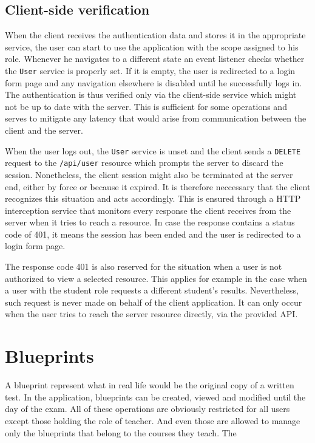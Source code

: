 \documentclass[thesis=M,english,hidelinks]{FITthesis}[2012/10/20]
\newcommand{\code}{\texttt}
\begin{document}
\subsection{Client-side verification}

When the client receives the authentication data and stores it in the appropriate service, the user can start to use the application with the scope assigned to his role. Whenever he navigates to a different state an event listener checks whether the \code{User} service is properly set. If it is empty, the user is redirected to a login form page and any navigation elsewhere is disabled until he successfully logs in. The authentication is thus verified only via the client-side service which might not be up to date with the server. This is sufficient for some operations and serves to mitigate any latency that would arise from communication between the client and the server.

When the user logs out, the \code{User} service is unset and the client sends a \code{DELETE} request to the \code{/api/user} resource which prompts the server to discard the session. Nonetheless, the client session might also be terminated at the server end, either by force or because it expired. It is therefore neccessary that the client recognizes this situation and acts accordingly. This is ensured through a HTTP interception service that monitors every response the client receives from the server when it tries to reach a resource. In case the response contains a status code of 401, it means the session has been ended and the user is redirected to a login form page.

The response code 401 is also reserved for the situation when a user is not authorized to view a selected resource. This applies for example in the case when a user with the student role requests a different student's results. Nevertheless, such request is never made on behalf of the client application. It can only occur when the user tries to reach the server resource directly, via the provided API.

\section{Blueprints}

A blueprint represent what in real life would be the original copy of a written test. In the application, blueprints can be created, viewed and modified until the day of the exam. All of these operations are obviously restricted for all users except those holding the role of teacher. And even those are allowed to manage only the blueprints that belong to the courses they teach. The
\end{document}
